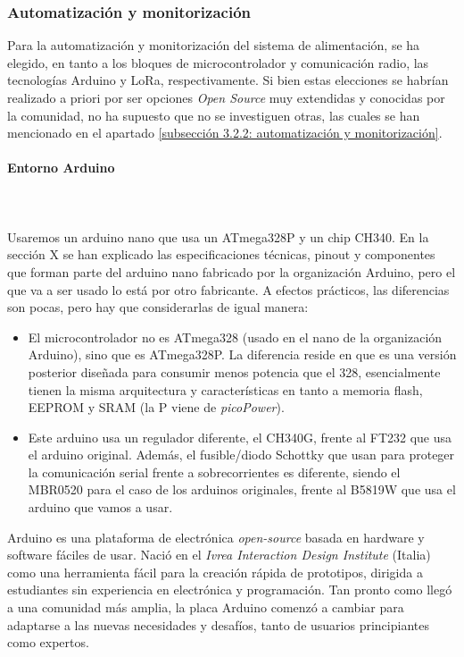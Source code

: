 \documentclass[12pt]{article}
\newcommand{\subsubsubsection}[1]{\paragraph{#1}\mbox{}\\}
\begin{document}
	\subsubsection{Automatización y monitorización}
	\label{subsubsection: automatizacion y monitorizacion}
	
	\noindent Para la automatización y monitorización del sistema de alimentación, se ha elegido, en tanto a los bloques de microcontrolador y  comunicación radio, las tecnologías Arduino y LoRa, respectivamente. Si bien estas elecciones se habrían realizado a priori por ser opciones \textit{Open Source} muy extendidas y conocidas por la comunidad, no ha supuesto que no se investiguen otras, las cuales se han mencionado en el apartado \ref{subsección 3.2.2: automatización y monitorización}.
	
	\subsubsubsection{Entorno Arduino}
	
	
	 \\
	
	\noindent Usaremos un arduino nano que usa un ATmega328P y un chip CH340. En la sección X se han explicado las especificaciones técnicas, pinout y componentes que forman parte del arduino nano fabricado por la organización Arduino, pero el que va a ser usado lo está por otro fabricante. A efectos prácticos, las diferencias son pocas, pero hay que considerarlas de igual manera:
	
	\begin{itemize}
		\item El microcontrolador no es ATmega328 (usado en el nano de la organización Arduino), sino que es ATmega328P. La diferencia reside en que es una versión posterior diseñada para consumir menos potencia que el 328, esencialmente tienen la misma arquitectura y características en tanto a memoria flash, EEPROM y SRAM (la P viene de \textit{picoPower}).
		\item Este arduino usa un regulador diferente, el CH340G, frente al FT232 que usa el arduino original. Además, el fusible/diodo Schottky que usan para proteger la comunicación serial frente a sobrecorrientes es diferente, siendo el MBR0520 para el caso de los arduinos originales, frente al B5819W que usa el arduino que vamos a usar.
	\end{itemize}
	
	\noindent Arduino es una plataforma de electrónica \textit{open-source} basada en hardware y software fáciles de usar. Nació en el \textit{Ivrea Interaction Design Institute} (Italia) como una herramienta fácil para la creación rápida de prototipos, dirigida a estudiantes sin experiencia en electrónica y programación. Tan pronto como llegó a una comunidad más amplia, la placa Arduino comenzó a cambiar para adaptarse a las nuevas necesidades y desafíos, tanto de usuarios principiantes como expertos. \\
	
\end{document}
